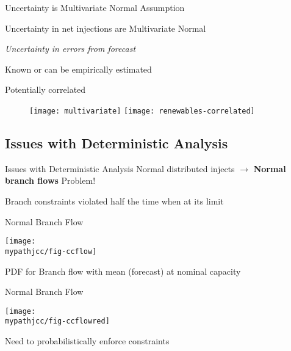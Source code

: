 \begin{frame}{Uncertainty is Multivariate Normal}
\alert{Assumption}

Uncertainty in net injections are Multivariate Normal
\bi
\item \textit{Uncertainty in errors from forecast}
\item Known or can be empirically estimated
\item Potentially correlated
\ei
\begin{center}
\begin{figure}
   \texttt{[image: multivariate]}
   \hfill
   \texttt{[image: renewables-correlated]}
\end{figure}
\end{center}

\end{frame}



\subsection{Issues with Deterministic Analysis}
\begin{frame}{Issues with Deterministic Analysis}
Normal distributed injects 
\pause 
$\rightarrow $
\textbf{Normal branch flows}\footnotemark
\vspace{20px}
\pause
\alert{Problem!}
\bi
\item Branch constraints violated half the time when at its limit
\ei
\end{frame}

\begin{frame}{Normal Branch Flow}
\begin{center}
\texttt{[image: \\mypathjcc/fig-ccflow]}
\end{center}
PDF for Branch flow with mean (forecast) at nominal capacity
\end{frame}


\begin{frame}{Normal Branch Flow}
\begin{center}
\texttt{[image: \\mypathjcc/fig-ccflowred]}
\end{center}

\alert{Need to probabilistically enforce constraints}

\end{frame}


